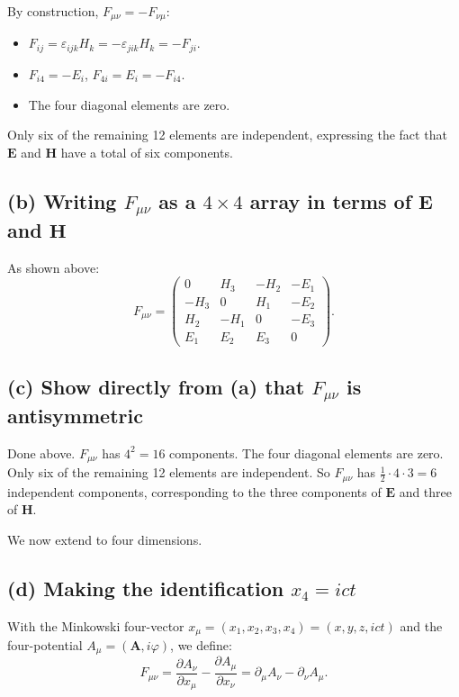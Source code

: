 \documentclass[12pt]{article}
\newcommand{\vect}[1]{\mathbf{#1}}
\begin{document}
By construction, $F_{\mu\nu} = -F_{\nu\mu}$:
\begin{itemize}
\item $F_{ij} = \varepsilon_{ijk}H_k = -\varepsilon_{jik}H_k = -F_{ji}$. \checkmark
\item $F_{i4} = -E_i$, $F_{4i} = E_i = -F_{i4}$. \checkmark
\item The four diagonal elements are zero. \checkmark
\end{itemize}

Only six of the remaining 12 elements are independent, expressing the fact that $\vect{E}$ and $\vect{H}$ have a total of six components.

\subsection*{(b) Writing $F_{\mu\nu}$ as a $4\times 4$ array in terms of $\vect{E}$ and $\vect{H}$}

As shown above:
\[
\boxed{F_{\mu\nu} = \begin{pmatrix}
0 & H_3 & -H_2 & -E_1 \\
-H_3 & 0 & H_1 & -E_2 \\
H_2 & -H_1 & 0 & -E_3 \\
E_1 & E_2 & E_3 & 0
\end{pmatrix}}.
\]

\subsection*{(c) Show directly from (a) that $F_{\mu\nu}$ is antisymmetric}

Done above. $F_{\mu\nu}$ has $4^2 = 16$ components. The four diagonal elements are zero. Only six of the remaining 12 elements are independent. So $F_{\mu\nu}$ has $\tfrac{1}{2}\cdot 4\cdot 3 = 6$ independent components, corresponding to the three components of $\vect{E}$ and three of $\vect{H}$.

We now extend to four dimensions.

\subsection*{(d) Making the identification $x_4 = ict$}

With the Minkowski four-vector $x_\mu = (x_1, x_2, x_3, x_4) = (x, y, z, ict)$ and the four-potential $A_\mu = (\vect{A}, i\varphi)$, we define:
\[
F_{\mu\nu} = \frac{\partial A_\nu}{\partial x_\mu} - \frac{\partial A_\mu}{\partial x_\nu} = \partial_\mu A_\nu - \partial_\nu A_\mu.
\]
\end{document}
